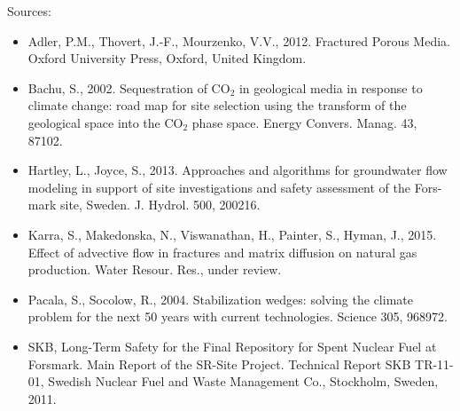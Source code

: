 \documentclass[letterpaper,10pt,english]{sphinxmanual}
\begin{document}
\begin{figure}[htbp]
\centering
\capstart

\noindent{}
\caption{}\label{\detokenize{applications:id3}}\end{figure}

Sources:
\begin{itemize}
\item {} 
Adler, P.M., Thovert, J.-F., Mourzenko, V.V., 2012. Fractured Porous Media. Oxford University Press, Oxford, United Kingdom.

\item {} 
Bachu, S., 2002. Sequestration of CO$_{\text{2}}$  in geological media in response to climate change: road map for site selection using the transform of the geological space into the CO$_{\text{2}}$  phase space. Energy Convers. Manag. 43, 87\textendash{}102.

\item {} 
Hartley, L., Joyce, S., 2013. Approaches and algorithms for groundwater flow modeling in support of site investigations and safety assessment of the Fors- mark site, Sweden. J. Hydrol. 500, 200\textendash{}216.

\item {} 
Karra, S., Makedonska, N., Viswanathan, H., Painter, S., Hyman, J., 2015. Effect of advective flow in fractures and matrix diffusion on natural gas production. Water Resour. Res., under review.

\item {} 
Pacala, S., Socolow, R., 2004. Stabilization wedges: solving the climate problem for the next 50 years with current technologies. Science 305, 968\textendash{}972.

\item {} 
SKB, Long-Term Safety for the Final Repository for Spent Nuclear Fuel at Forsmark. Main Report of the SR-Site Project. Technical Report SKB TR-11-01, Swedish Nuclear Fuel and Waste Management Co., Stockholm, Sweden, 2011.

\end{itemize}
\end{document}
